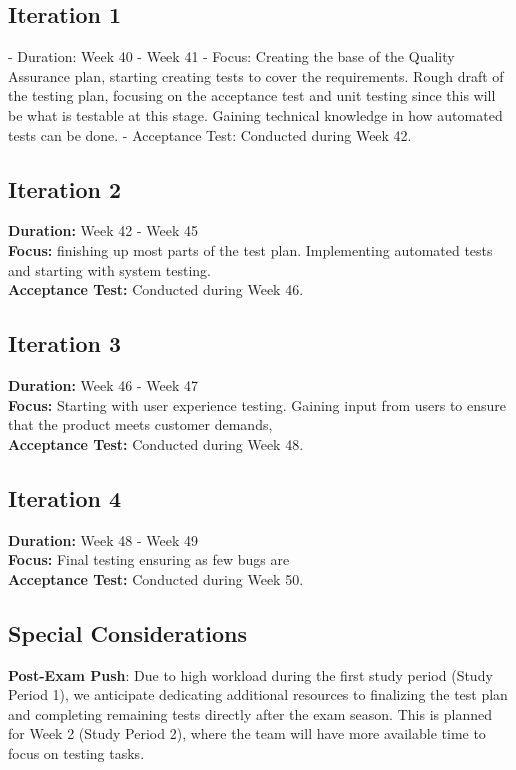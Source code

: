 \documentclass{article}
\begin{document}
\subsection{Iteration 1}
  - Duration: Week 40 - Week 41
  - Focus: Creating the base of the Quality Assurance plan, starting creating tests to cover the requirements. Rough draft of the testing plan, focusing on the acceptance test and unit testing since this will be what is testable at this stage. Gaining technical knowledge in how automated tests can be done.
  - Acceptance Test: Conducted during Week 42.

\subsection{Iteration 2}
\textbf{Duration:} Week 42 - Week 45 \\
\textbf{Focus:} finishing up most parts of the test plan. Implementing automated tests and starting with system testing.  \\
\textbf{Acceptance Test:} Conducted during Week 46.\\

\subsection{Iteration 3}
\textbf{Duration:} Week 46 - Week 47\\
\textbf{Focus:} Starting with user experience testing. Gaining input from users to ensure that the product meets customer demands, \\
\textbf{Acceptance Test:} Conducted during Week 48.\\

\subsection{Iteration 4}
\textbf{Duration:} Week 48 - Week 49\\
\textbf{Focus:} Final testing ensuring as few bugs are \\
\textbf{Acceptance Test:} Conducted during Week 50.\\

\subsection{Special Considerations}

\textbf{Post-Exam Push}: Due to high workload during the first study period (Study Period 1), we anticipate dedicating additional resources to finalizing the test plan and completing remaining tests directly after the exam season. This is planned for Week 2 (Study Period 2), where the team will have more available time to focus on testing tasks.
\end{document}
